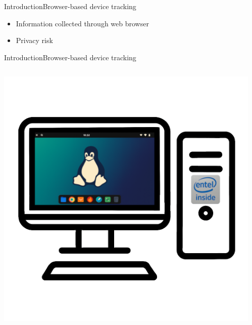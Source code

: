 \documentclass[aspectratio=169, hyperref={colorlinks=true, allcolors=SecondaryColor}, c]{beamer}
\begin{document}
\begin{frame}[fragile]{Introduction}{Browser-based device tracking}
\begin{transformation}
\begin{adjustbox}{scale=1}
\begin{minipage}{1\textwidth}
				\end{minipage}
			\end{adjustbox}
		\end{transformation}
		\vspace{-0.5cm}
		\begin{itemize}
			\item Information collected through web browser
			\item Privacy risk
		\end{itemize}
	\end{frame}

	\begin{frame}[fragile]{Introduction}{Browser-based device tracking}
		\begin{columns}
			\begin{column}{0.33\textwidth}
				\includegraphics[width=1\textwidth]{./figures/computer_alpha_screen_2_golden.png}
			\end{column}
			\begin{column}{0.33\textwidth}

\end{column}
\end{columns}
\end{frame}
\end{document}
